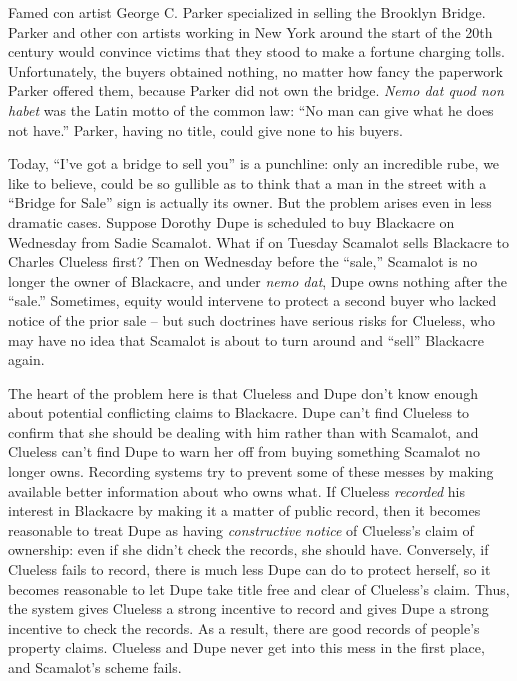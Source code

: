 Famed con artist George C. Parker specialized in selling the Brooklyn Bridge.
Parker and other con artists working in New York around the start of the 20th
century would convince victims that they stood to make a fortune charging
tolls. Unfortunately, the buyers obtained nothing, no matter how fancy the
paperwork Parker offered them, because Parker did not own the bridge.
\textit{Nemo dat quod non habet} was the Latin motto of the common law: ``No
man can give what he does not have.'' Parker, having no title, could give none
to his buyers.

Today, ``I've got a bridge to sell you'' is a punchline: only an incredible
rube, we like to believe, could be so gullible as to think that a man in the
street with a ``Bridge for Sale'' sign is actually its owner. But the problem
arises even in less dramatic cases. Suppose Dorothy Dupe is scheduled to buy
Blackacre on Wednesday from Sadie Scamalot. What if on Tuesday Scamalot sells
Blackacre to Charles Clueless first? Then on Wednesday before the ``sale,''
Scamalot is no longer the owner of Blackacre, and under \textit{nemo dat}, Dupe
owns nothing after the ``sale.'' Sometimes, equity would intervene to protect a
second buyer who lacked notice of the prior sale -- but such doctrines have
serious risks for Clueless, who may have no idea that Scamalot is about to turn
around and ``sell'' Blackacre again.

The heart of the problem here is that Clueless and Dupe don't know enough about
potential conflicting claims to Blackacre. Dupe can't find Clueless to confirm
that she should be dealing with him rather than with Scamalot, and Clueless
can't find Dupe to warn her off from buying something Scamalot no longer owns.
Recording systems try to prevent some of these messes by making available
better information about who owns what. If Clueless \textit{recorded} his
interest in Blackacre by making it a matter of public record, then it becomes
reasonable to treat Dupe as having \textit{constructive} \textit{notice} of
Clueless's claim of ownership: even if she didn't check the records, she should
have. Conversely, if Clueless fails to record, there is much less Dupe can do
to protect herself, so it becomes reasonable to let Dupe take title free and
clear of Clueless's claim. Thus, the system gives Clueless a strong incentive
to record and gives Dupe a strong incentive to check the records. As a result,
there are good records of people's property claims. Clueless and Dupe never get
into this mess in the first place, and Scamalot's scheme fails.

